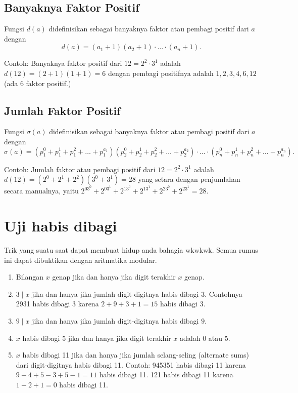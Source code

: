 	     \subsection{Banyaknya Faktor Positif}
	     Fungsi $d(a)$ didefinisikan sebagai banyaknya faktor atau pembagi positif dari $a$ dengan
	     $$d(a) = (a_1+1)(a_2+1)\cdot \ldots \cdot (a_n+1).$$
	     
	     Contoh: Banyaknya faktor positif dari $12= 2^2 \cdot 3^1$ adalah $d(12)=(2+1)(1+1)=6$ dengan pembagi positifnya adalah $1,2,3,4,6,12$ (ada 6 faktor positif.)
	     
	     \subsection{Jumlah Faktor Positif}
	     Fungsi $\sigma (a)$ didefinisikan sebagai banyaknya faktor atau pembagi positif dari $a$ dengan
	     $$\sigma (a) = (p_1^0+p_1^1+p_1^2+\dots+p_1^{a_1})(p_2^0+p_2^1+p_2^2+\dots+p_2^{a_2})\cdot \ldots \cdot (p_n^0+p_n^1+p_n^2+\dots+p_n^{a_n}).$$
	     
	     Contoh: Jumlah faktor atau pembagi positif dari $12= 2^2 \cdot 3^1$ adalah $d(12)=(2^0+2^1+2^2)(3^0+3^1)=28$ yang setara dengan penjumlahan secara manualnya, yaitu $2^03^0+2^03^1+2^13^0+2^13^1+2^23^0+2^23^1=28.$
	     
	     \section{Uji habis dibagi}
	         Trik yang suatu saat dapat membuat hidup anda bahagia wkwkwk. Semua rumus ini dapat dibuktikan dengan aritmatika modular.
	         \begin{enumerate}
	             \item Bilangan $x$ genap jika dan hanya jika digit terakhir $x$ genap.
	             \item $3 \mid x$ jika dan hanya jika jumlah digit-digitnya habis dibagi $3$. Contohnya 2931 habis dibagi 3 karena $2+9+3+1=15$ habis dibagi 3.
	             \item $9 \mid x$ jika dan hanya jika jumlah digit-digitnya habis dibagi $9$.
	             \item $x$ habis dibagi 5 jika dan hanya jika digit terakhir $x$ adalah $0$ atau $5$.
	             \item $x$ habis dibagi 11 jika dan hanya jika jumlah selang-seling (alternate sums) dari digit-digitnya habis dibagi 11. Contoh: 945351 habis dibagi 11 karena $9-4+5-3+5-1=11$ habis dibagi 11. 121 habis dibagi 11 karena $1-2+1=0$ habis dibagi 11.
	         \end{enumerate}
	         
